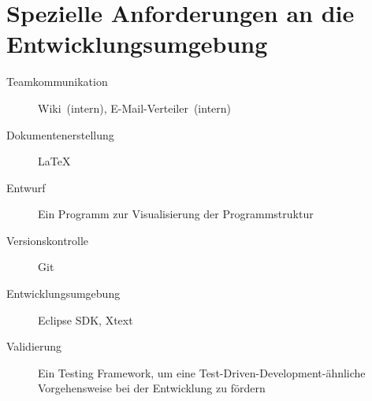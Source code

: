 \section{Spezielle Anforderungen an die Entwicklungsumgebung}%

\begin{description}%
    \item [Teamkommunikation] Wiki~(intern), E-Mail-Verteiler~(intern)
    \item [Dokumentenerstellung] \see \LaTeX{}%
    \item [Entwurf] Ein Programm zur Visualisierung der Programmstruktur
    \item [Versionskontrolle] \see Git%
    \item [Entwicklungsumgebung] \see Eclipse SDK, \see Xtext%
    \item [Validierung] Ein Testing Framework, um eine Test-Driven-Development-ähnliche Vorgehensweise bei der Entwicklung zu fördern
\end{description}%
